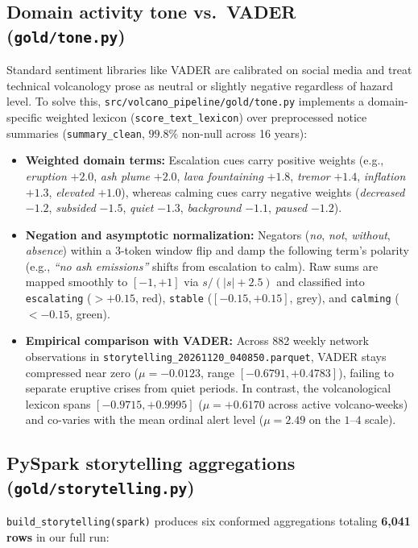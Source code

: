 \documentclass[11pt,a4paper]{article}
\begin{document}
\subsection{Domain activity tone vs.\ VADER (\texttt{gold/tone.py})}
Standard sentiment libraries like VADER are calibrated on social media and treat technical volcanology prose as neutral or slightly negative regardless of hazard level. To solve this, \texttt{src/volcano\_pipeline/gold/tone.py} implements a domain-specific weighted lexicon (\texttt{score\_text\_lexicon}) over preprocessed notice summaries (\texttt{summary\_clean}, $99.8\%$ non-null across 16 years):
\begin{itemize}
  \item \textbf{Weighted domain terms:} Escalation cues carry positive weights (e.g., \emph{eruption} $+2.0$, \emph{ash plume} $+2.0$, \emph{lava fountaining} $+1.8$, \emph{tremor} $+1.4$, \emph{inflation} $+1.3$, \emph{elevated} $+1.0$), whereas calming cues carry negative weights (\emph{decreased} $-1.2$, \emph{subsided} $-1.5$, \emph{quiet} $-1.3$, \emph{background} $-1.1$, \emph{paused} $-1.2$).
  \item \textbf{Negation and asymptotic normalization:} Negators (\emph{no}, \emph{not}, \emph{without}, \emph{absence}) within a 3-token window flip and damp the following term's polarity (e.g., \emph{``no ash emissions''} shifts from escalation to calm). Raw sums are mapped smoothly to $[-1, +1]$ via $s / (|s| + 2.5)$ and classified into \texttt{escalating} ($> +0.15$, red), \texttt{stable} ($[-0.15, +0.15]$, grey), and \texttt{calming} ($< -0.15$, green).
  \item \textbf{Empirical comparison with VADER:} Across 882 weekly network observations in \texttt{storytelling\_20261120\_040850.parquet}, VADER stays compressed near zero ($\mu = -0.0123$, range $[-0.6791, +0.4783]$), failing to separate eruptive crises from quiet periods. In contrast, the volcanological lexicon spans $[-0.9715, +0.9995]$ ($\mu = +0.6170$ across active volcano-weeks) and co-varies with the mean ordinal alert level ($\mu = 2.49$ on the $1\text{--}4$ scale).
\end{itemize}

\subsection{PySpark storytelling aggregations (\texttt{gold/storytelling.py})}
\texttt{build\_storytelling(spark)} produces six conformed aggregations totaling \textbf{6,041 rows} in our full run:
\end{document}
